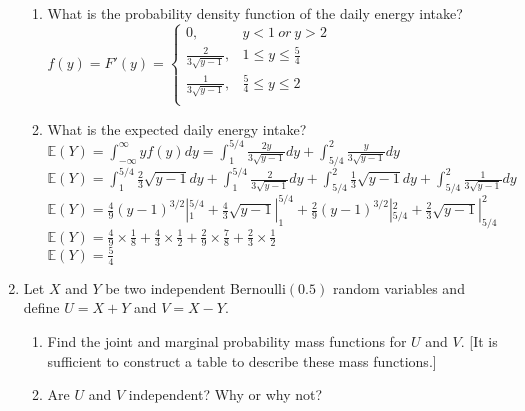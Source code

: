 \documentclass[11pt]{article}
\begin{document}
\begin{enumerate}[label=\textbf{Question \arabic*:},start=1]
\begin{enumerate}
	\item What is the probability density function of the daily energy intake?\\
	
	$f(y) = F'(y) = \begin{cases}
		0, & y < 1\ or\ y > 2\\
		\frac{2}{3 \sqrt{y-1}}, & 1 \leq y \le \frac{5}{4} \\
		\frac{1}{ 3\sqrt{y-1}}, & \frac{5}{4} \le y \leq 2\\
		\end{cases}$\\

	\item What is the expected daily energy intake?\\
	
	$\mathbb{E}(Y) = \int_{-\infty}^{\infty} y f(y) dy = \int_{1}^{5/4} \frac{2y}{3\sqrt{y-1}} dy+ \int_{5/4}^{2} \frac{y}{3\sqrt{y-1}} dy$\\
	$\mathbb{E}(Y) = \int_{1}^{5/4} \frac{2}{3} \sqrt{y-1}dy + \int_{1}^{5/4} \frac{2}{3\sqrt{y-1}}dy + \int_{5/4}^{2} \frac{1}{3} \sqrt{y-1}dy + \int_{5/4}^{2} \frac{1}{3\sqrt{y-1}} dy$ \\
	$\mathbb{E}(Y) = \frac{4}{9} (y-1)^{3/2} |_{1}^{5/4} + \frac{4}{3} \sqrt{y-1} |_{1}^{5/4} + \frac{2}{9} (y-1)^{3/2} |_{5/4}^{2} + \frac{2}{3} \sqrt{y-1} |_{5/4}^{2} $ \\
	$\mathbb{E}(Y) = \frac{4}{9} \times \frac{1}{8} + \frac{4}{3} \times \frac{1}{2} + \frac{2}{9} \times \frac{7}{8}  + \frac{2}{3} \times \frac{1}{2}$ \\
	
	$\mathbb{E}(Y) = \frac{5}{4}$
	
\end{enumerate}





\item Let $X$ and $Y$ be two independent Bernoulli$(0.5)$ random variables and define $U = X + Y$ and $V = X - Y$. 
\begin{enumerate}
	\item Find the joint and marginal probability mass functions for $U$ and $V$. [It is sufficient to construct a table to describe these mass functions.]\\

	\item Are $U$ and $V$ independent? Why or why not?\\


\end{enumerate}
\end{enumerate}
\end{document}
